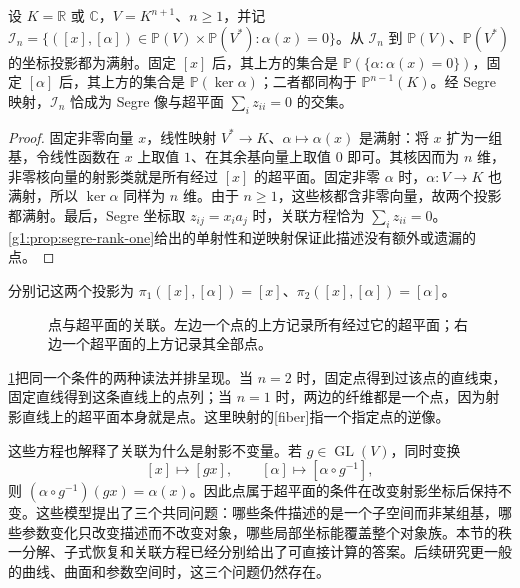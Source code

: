 \begin{proposition}\label{g1:prop:incidence-fibers}
	设 \(K=\mathbb R\) 或 \(\mathbb C\)，\(V=K^{n+1}\)、\(n\ge1\)，并记 \(\mathcal I_n=\{([x],[\alpha])\in\mathbb P(V)\times\mathbb P(V^*):\alpha(x)=0\}\)。从 \(\mathcal I_n\) 到 \(\mathbb P(V)\)、\(\mathbb P(V^*)\) 的坐标投影都为满射。固定 \([x]\) 后，其上方的集合是 \(\mathbb P(\{\alpha:\alpha(x)=0\})\)，固定 \([\alpha]\) 后，其上方的集合是 \(\mathbb P(\ker\alpha)\)；二者都同构于 \(\mathbb P^{n-1}(K)\)。经 Segre 映射，\(\mathcal I_n\) 恰成为 Segre 像与超平面 \(\sum_i z_{ii}=0\) 的交集。
\end{proposition}
\begin{proof}
	固定非零向量 \(x\)，线性映射 \(V^*\rightarrow K\)、\(\alpha\mapsto\alpha(x)\) 是满射：将 \(x\) 扩为一组基，令线性函数在 \(x\) 上取值 \(1\)、在其余基向量上取值 \(0\) 即可。其核因而为 \(n\) 维，非零核向量的射影类就是所有经过 \([x]\) 的超平面。固定非零 \(\alpha\) 时，\(\alpha:V\rightarrow K\) 也满射，所以 \(\ker\alpha\) 同样为 \(n\) 维。由于 \(n\ge1\)，这些核都含非零向量，故两个投影都满射。最后，Segre 坐标取 \(z_{ij}=x_i a_j\) 时，关联方程恰为 \(\sum_i z_{ii}=0\)。\cref{g1:prop:segre-rank-one}给出的单射性和逆映射保证此描述没有额外或遗漏的点。
\end{proof}

分别记这两个投影为 \(\pi_1([x],[\alpha])=[x]\)、\(\pi_2([x],[\alpha])=[\alpha]\)。

\begin{figure}[htbp]
	\centering
	
	\caption[点与超平面的关联]{点与超平面的关联。左边一个点的上方记录所有经过它的超平面；右边一个超平面的上方记录其全部点。}
	\label{g1:fig:incidence-projections}
\end{figure}

\cref{g1:fig:incidence-projections}把同一个条件的两种读法并排呈现。当 \(n=2\) 时，固定点得到过该点的直线束，固定直线得到这条直线上的点列；当 \(n=1\) 时，两边的纤维都是一个点，因为射影直线上的超平面本身就是点。这里映射的[fiber]指一个指定点的逆像。

\ProseParagraphBreak

这些方程也解释了关联为什么是射影不变量。若 \(g\in\operatorname{GL}(V)\)，同时变换
\[
	[x]\longmapsto[gx],\qquad [\alpha]\longmapsto[\alpha\circ g^{-1}],
\]
则 \((\alpha\circ g^{-1})(gx)=\alpha(x)\)。因此点属于超平面的条件在改变射影坐标后保持不变。这些模型提出了三个共同问题：哪些条件描述的是一个子空间而非某组基，哪些参数变化只改变描述而不改变对象，哪些局部坐标能覆盖整个对象族。本节的秩一分解、子式恢复和关联方程已经分别给出了可直接计算的答案。后续研究更一般的曲线、曲面和参数空间时，这三个问题仍然存在。
